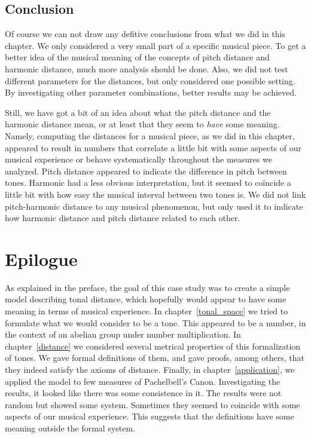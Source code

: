 \documentclass[a4paper]{book}
\theoremstyle{definition}
\begin{document}
\section{Conclusion}
Of course we can not draw any defitive conclusions from what we did in this chapter.
We only considered a very small part of a specific musical piece.
To get a better idea of the musical meaning of the concepts of pitch distance and harmonic distance, much more analysis should be done.
Also, we did not test different parameters for the distances, but only considered one possible setting.
By investigating other parameter combinations, better results may be achieved.

Still, we have got a bit of an idea about what the pitch distance and the harmonic distance mean, or at least that they seem to \emph{have} some meaning.
Namely, computing the distances for a musical piece, as we did in this chapter, appeared to result in numbers that correlate a little bit with some aspects of our musical experience or behave systematically throughout the measures we analyzed.
Pitch distance appeared to indicate the difference in pitch between tones.
Harmonic had a less obvious interpretation, but it seemed to co\"incide a little bit with how easy the musical interval between two tones is.
We did not link pitch-harmonic distance to any musical phenomenon, but only used it to indicate how harmonic distance and pitch distance related to each other.

\chapter*{Epilogue}

As explained in the preface, the goal of this case study was to create a simple model describing tonal distance, which hopefully would appear to have some meaning in terms of musical experience.
In chapter~\ref{tonal_space} we tried to formulate what we would consider to be a tone.
This appeared to be a number, in the context of an abelian group under number multiplication.
In chapter~\ref{distance} we considered several metrical properties of this formalization of tones.
We gave formal definitions of them, and gave proofs, among others, that they indeed satisfy the axioms of distance.
Finally, in chapter~\ref{application}, we applied the model to few measures of Pachelbell's Canon.
Investigating the results, it looked like there was some consistence in it.
The results were not random but showed some system.
Sometimes they seemed to coincide with some aspects of our musical experience.
This suggests that the definitions have some meaning outside the formal system.
\end{document}
